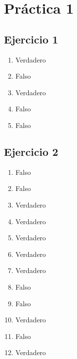 
\usepackage{caratula}
\usepackage{enumerate}
\usepackage{hyperref}
\usepackage{graphicx}
\usepackage{amsfonts}
\usepackage{enumitem}

\decimalpoint
\hypersetup{colorlinks=true, linkcolor=black, urlcolor=blue}
\setlength{\parindent}{0em}
\setlength{\parskip}{0.5em}
\setcounter{tocdepth}{2} %
\setcounter{section}{0} %
\renewcommand{\thesubsubsection}{\thesubsection.\Alph{subsubsection}}
\graphicspath{ {images/} }





\maketitle
\newpage

\tableofcontents
\newpage

\section{Práctica 1}

\subsection{Ejercicio 1}
\begin{enumerate}[label=(\alph*)]
    \item Verdadero
    \item Falso
    \item Verdadero
    \item Falso
    \item Falso
\end{enumerate}

\subsection{Ejercicio 2}
\begin{enumerate}[label=(\alph*)]
    \item Falso
    \item Falso
    \item Verdadero
    \item Verdadero
    \item Verdadero
    \item Verdadero
    \item Verdadero
    \item Falso
    \item Falso
    \item Verdadero
    \item Falso
    \item Verdadero
\end{enumerate}

